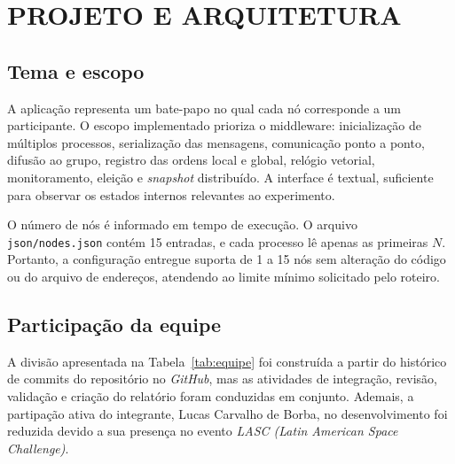 \chapter{PROJETO E ARQUITETURA}\label{chap:projeto}

\section{Tema e escopo}

A aplicação representa um bate-papo no qual cada nó corresponde a um
participante. O escopo implementado prioriza o middleware: inicialização de
múltiplos processos, serialização das mensagens, comunicação ponto a ponto,
difusão ao grupo, registro das ordens local e global, relógio vetorial,
monitoramento, eleição e \textit{snapshot} distribuído. A interface é textual,
suficiente para observar os estados internos relevantes ao experimento.

O número de nós é informado em tempo de execução. O arquivo
\texttt{json/nodes.json} contém 15 entradas, e cada processo lê apenas as
primeiras $N$. Portanto, a configuração entregue suporta de 1 a 15 nós sem
alteração do código ou do arquivo de endereços, atendendo ao limite mínimo
solicitado pelo roteiro.

\section{Participação da equipe}

A divisão apresentada na Tabela~\ref{tab:equipe} foi construída a partir do
histórico de commits do repositório no \textit{GitHub}, mas as atividades de
integração, revisão, validação e criação do relatório foram conduzidas em
conjunto. Ademais, a partipação ativa do integrante, Lucas Carvalho de Borba,
no desenvolvimento foi reduzida devido a sua presença no evento \textit{LASC
    (Latin American Space Challenge)}.

